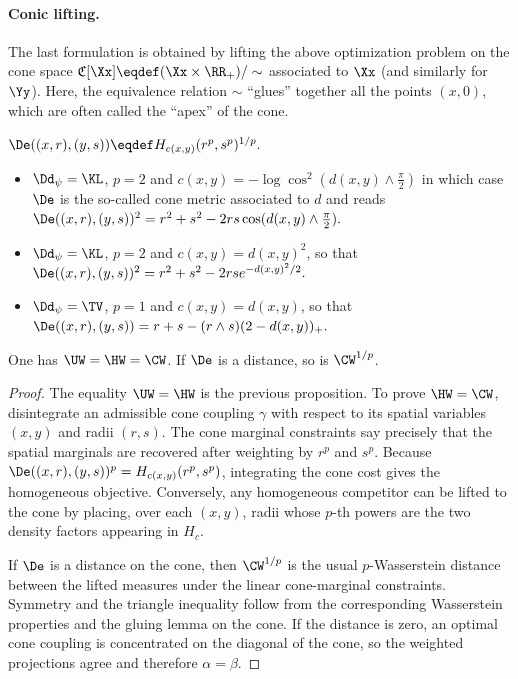 \paragraph{Conic lifting.}
The last formulation is obtained by lifting the above optimization problem on the cone space $\mathfrak{C}[\Xx] \eqdef (\Xx \times \RR_+) / \sim$ associated to $\Xx$ (and similarly for $\Yy$). Here, the equivalence relation $\sim$ ``glues'' together all the points $(x,0)$, which are often called the ``apex'' of the cone.

\(\De((x,r),(y,s)) \eqdef H_{c(x,y)}(r^p,s^p)^{1/p}.\)
\begin{itemize}
\item $\Dd_\psi=\KL$, $p=2$ and $c(x,y)=-\log \cos^2(d(x,y) \wedge \frac{\pi}{2})$ in which case $\De$ is the so-called cone metric associated to $d$ and reads
\(\De((x,r),(y,s))^2 = r^2+s^2-2rs \cos( d(x,y) \wedge \frac{\pi}{2} ).\)
\item $\Dd_\psi=\KL$, $p=2$ and $c(x,y)=d(x,y)^2$, so that
\(\De((x,r),(y,s))^2 = r^2+s^2-2rs e^{-d(x,y)^2/2}.\)
\item $\Dd_\psi=\TV$, $p=1$ and $c(x,y)=d(x,y)$, so that
\(\De((x,r),(y,s)) = r+s-(r \wedge s)(2-d(x,y))_+.\)
\end{itemize}
\begin{thm}\label{thm-cone-unbalanced-ot}
One has $\UW=\HW=\CW$. If $\De$ is a distance, so is $\CW^{1/p}$.
\end{thm}
\begin{proof}
The equality $\UW=\HW$ is the previous proposition. To prove $\HW=\CW$, disintegrate an admissible cone coupling $\gamma$ with respect to its spatial variables $(x,y)$ and radii $(r,s)$. The cone marginal constraints say precisely that the spatial marginals are recovered after weighting by $r^p$ and $s^p$. Because $\De((x,r),(y,s))^p=H_{c(x,y)}(r^p,s^p)$, integrating the cone cost gives the homogeneous objective. Conversely, any homogeneous competitor can be lifted to the cone by placing, over each $(x,y)$, radii whose $p$-th powers are the two density factors appearing in $H_c$.

If $\De$ is a distance on the cone, then $\CW^{1/p}$ is the usual $p$-Wasserstein distance between the lifted measures under the linear cone-marginal constraints. Symmetry and the triangle inequality follow from the corresponding Wasserstein properties and the gluing lemma on the cone. If the distance is zero, an optimal cone coupling is concentrated on the diagonal of the cone, so the weighted projections agree and therefore $\alpha=\beta$.
\end{proof}
